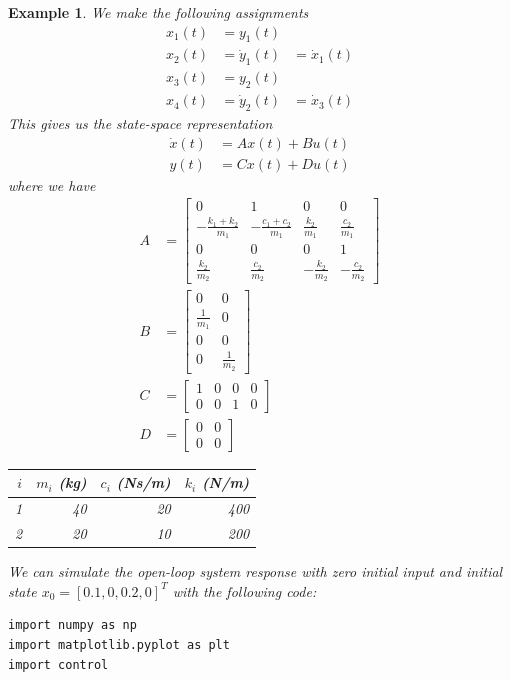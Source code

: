 \documentclass[11pt]{book}
\theoremstyle{example}
\newtheorem{example}{Example}[section]
\begin{document}
\begin{example}
We make the following assignments
\begin{align}
	x_1(t)&=y_1(t)&\\
	x_2(t)&=\dot{y}_1(t)&=\dot{x}_1(t)\\
	x_3(t)&=y_2(t)&\\
	x_4(t)&=\dot{y}_2(t)&=\dot{x}_3(t)
\end{align}
This gives us the state-space representation
\begin{align}
	\dot{x}(t)&=Ax(t)+Bu(t)\\
	y(t)&=Cx(t)+Du(t)
\end{align}
where we have
\begin{align}
	A&=
	\begin{bmatrix}
		0&1&0&0\\
		-\frac{k_1+k_2}{m_1}&-\frac{c_1+c_2}{m_1}&\frac{k_2}{m_1}&\frac{c_2}{m_1}\\
		0&0&0&1\\
		\frac{k_2}{m_2}&\frac{c_2}{m_2}&-\frac{k_2}{m_2}&-\frac{c_2}{m_2}
	\end{bmatrix}\\
	B&=
	\begin{bmatrix}
		0&0\\
		\frac{1}{m_1}&0\\
		0&0\\
		0&\frac{1}{m_2}
	\end{bmatrix}\\
	C&=
	\begin{bmatrix}
		1&0&0&0\\
		0&0&1&0
	\end{bmatrix}\\
	D&=
	\begin{bmatrix}
		0&0\\
		0&0
	\end{bmatrix}
\end{align}
\begin{center}
	\begin{tabular}{rrrr}
		\hline
		$i$ & $m_i$ (kg) & $c_i$ (Ns/m) & $k_i$ (N/m)\\
		\hline
		1 & 40 & 20 & 400\\
		2 & 20 & 10 & 200\\
		\hline
	\end{tabular}
\end{center}
We can simulate the open-loop system response with zero initial input and initial state $x_0=[0.1,0,0.2,0]^T$ with the following code:
\begin{verbatim}
import numpy as np
import matplotlib.pyplot as plt
import control


\end{verbatim}
\end{example}
\end{document}
